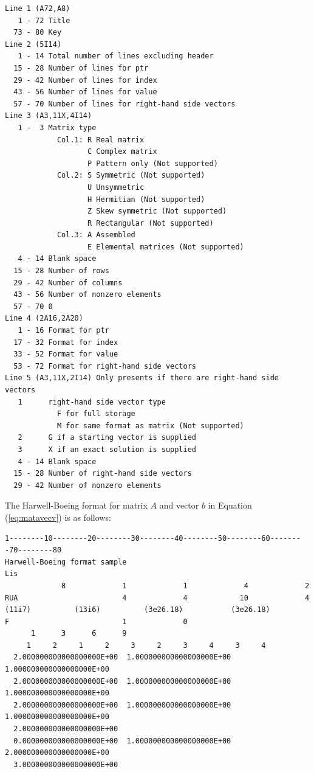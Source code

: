 \documentclass[a4paper]{article}
\begin{document}
{\small
\begin{verbatim}
Line 1 (A72,A8)
   1 - 72 Title
  73 - 80 Key
Line 2 (5I14)
   1 - 14 Total number of lines excluding header 
  15 - 28 Number of lines for ptr
  29 - 42 Number of lines for index
  43 - 56 Number of lines for value
  57 - 70 Number of lines for right-hand side vectors
Line 3 (A3,11X,4I14)
   1 -  3 Matrix type 
            Col.1: R Real matrix
                   C Complex matrix
                   P Pattern only (Not supported)
            Col.2: S Symmetric (Not supported)
                   U Unsymmetric
                   H Hermitian (Not supported)
                   Z Skew symmetric (Not supported)
                   R Rectangular (Not supported)
            Col.3: A Assembled
                   E Elemental matrices (Not supported)
   4 - 14 Blank space
  15 - 28 Number of rows
  29 - 42 Number of columns 
  43 - 56 Number of nonzero elements
  57 - 70 0
Line 4 (2A16,2A20)
   1 - 16 Format for ptr
  17 - 32 Format for index
  33 - 52 Format for value
  53 - 72 Format for right-hand side vectors
Line 5 (A3,11X,2I14) Only presents if there are right-hand side vectors
   1      right-hand side vector type
            F for full storage
            M for same format as matrix (Not supported)
   2      G if a starting vector is supplied
   3      X if an exact solution is supplied
   4 - 14 Blank space
  15 - 28 Number of right-hand side vectors 
  29 - 42 Number of nonzero elements
\end{verbatim}
}

The Harwell-Boeing format for matrix $A$ and vector $b$ in Equation (\ref{eq:matavecv}) is as follows: 

{\small
\begin{verbatim}
1--------10--------20--------30--------40--------50--------60--------70--------80
Harwell-Boeing format sample                                            Lis
             8             1             1             4             2
RUA                        4             4            10             4
(11i7)          (13i6)          (3e26.18)           (3e26.18)
F                          1             0
      1      3      6      9
     1     2     1     2     3     2     3     4     3     4
  2.000000000000000000E+00  1.000000000000000000E+00  1.000000000000000000E+00
  2.000000000000000000E+00  1.000000000000000000E+00  1.000000000000000000E+00
  2.000000000000000000E+00  1.000000000000000000E+00  1.000000000000000000E+00
  2.000000000000000000E+00
  0.000000000000000000E+00  1.000000000000000000E+00  2.000000000000000000E+00
  3.000000000000000000E+00
\end{verbatim}
}
\end{document}
